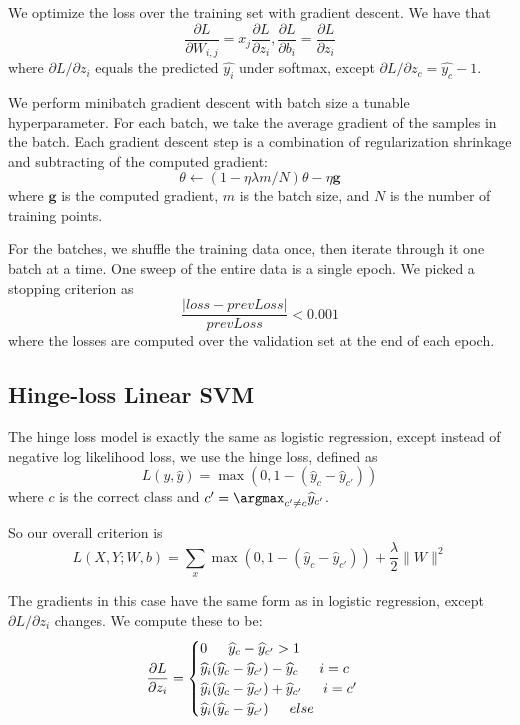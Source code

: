 \documentclass[11pt]{article}
\begin{document}
We optimize the loss over the training set with gradient descent. We have that
$$\frac{\partial L}{\partial W_{i,j}} = x_j \frac{\partial L}{\partial z_i}, \frac{\partial L}{\partial b_i} = \frac{\partial L}{\partial z_i}$$
where $\partial L / \partial z_i$ equals the predicted $\widehat{y_i}$ under softmax, except $\partial L / \partial z_c = \widehat{y_c} - 1$.

We perform minibatch gradient descent with batch size a tunable hyperparameter. For each batch, we take the average gradient of the samples in the batch. Each gradient descent step is a combination of regularization shrinkage and subtracting of the computed gradient:
$$\theta \leftarrow (1 - \eta \lambda m / N) \theta - \eta \mathbf{g}$$
where $\mathbf{g}$ is the computed gradient, $m$ is the batch size, and $N$ is the number of training points.

For the batches, we shuffle the training data once, then iterate through it one batch at a time. One sweep of the entire data is a single epoch. We picked a stopping criterion as
$$\frac{| loss - prevLoss |}{prevLoss} < 0.001$$
where the losses are computed over the validation set at the end of each epoch.

\subsection{Hinge-loss Linear SVM}

The hinge loss model is exactly the same as logistic regression, except instead of negative log likelihood loss, we use the hinge loss, defined as
$$L(y, \widehat{y}) = \max(0, 1 - (\widehat{y}_c - \widehat{y}_{c'}))$$
where $c$ is the correct class and $c' = \argmax_{c' \neq c} \widehat{y}_{c'}$.

So our overall criterion is
$$L(X, Y; W, b) = \sum_x \max(0, 1 - (\widehat{y}_c - \widehat{y}_{c'})) + \frac{\lambda}{2} \lVert W \rVert ^2$$

The gradients in this case have the same form as in logistic regression, except $\partial L / \partial z_i$ changes. We compute these to be:
$$\frac{\partial L}{\partial z_i} = \begin{cases} 0 \indent \widehat{y}_c - \widehat{y}_{c'} > 1 \\
 \widehat{y}_i(\widehat{y}_c - \widehat{y}_{c'}) - \widehat{y}_c \indent i = c \\
\widehat{y}_i(\widehat{y}_c - \widehat{y}_{c'}) + \widehat{y}_{c'} \indent i = c' \\
\widehat{y}_i(\widehat{y}_c - \widehat{y}_{c'}) \indent else \end{cases}$$
\end{document}
